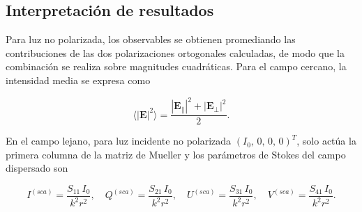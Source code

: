 \subsection{Interpretación de resultados}
\label{sec:interpretacion}
 
Para luz no polarizada, los observables se obtienen promediando 
las contribuciones de las dos polarizaciones
ortogonales calculadas, de modo que la combinación se realiza sobre
magnitudes cuadráticas. Para el campo cercano, la intensidad media se
expresa como
 
\begin{equation}
      \label{eq:nearfield_intensity}
  \langle |\mathbf{E}|^2 \rangle
  = \frac{|\mathbf{E}_\parallel|^2 + |\mathbf{E}_\perp|^2}{2}.
\end{equation}
 
En el campo lejano, para luz incidente no polarizada
$(I_0,\,0,\,0,\,0)^T$, solo actúa la primera columna de la matriz de
Mueller y los parámetros de Stokes del campo dispersado son
 
\begin{equation}
      \label{eq:stokes_farfield}
  I^{(sca)} = \frac{S_{11}\,I_0}{k^2r^2},\quad
  Q^{(sca)} = \frac{S_{21}\,I_0}{k^2r^2},\quad
  U^{(sca)} = \frac{S_{31}\,I_0}{k^2r^2},\quad
  V^{(sca)} = \frac{S_{41}\,I_0}{k^2r^2}.
\end{equation}
 
 
 
